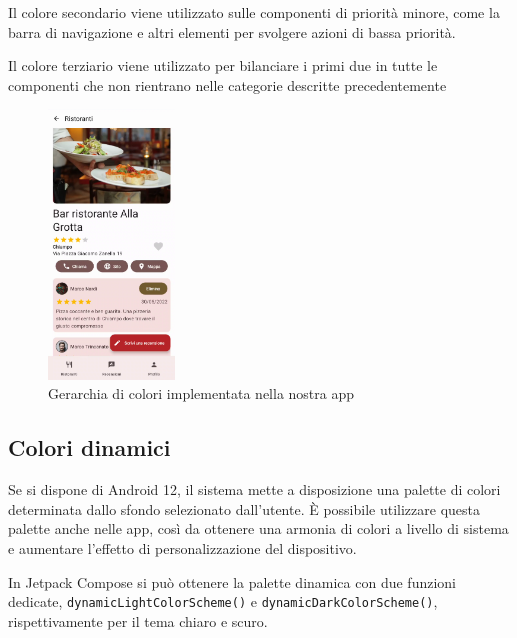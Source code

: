 \documentclass[12pt, a4paper]{report}
\begin{document}
		Il colore secondario viene utilizzato sulle componenti di priorità minore, come la barra di navigazione e altri elementi per svolgere azioni di bassa priorità.
		
		Il colore terziario viene utilizzato per bilanciare i primi due in tutte le componenti che non rientrano nelle categorie descritte precedentemente
		
		\begin{figure}[h]
   			\centering
   			\includegraphics[width=0.3\textwidth]{gerarchia_colori} %
 			\caption{Gerarchia di colori implementata nella nostra app}
 			\label{gerarchia_colori}
		\end{figure}
		
		\subsection{Colori dinamici}
		Se si dispone di Android 12, il sistema mette a disposizione una palette di colori determinata dallo sfondo selezionato dall'utente. È possibile utilizzare questa palette anche nelle app, così da ottenere una armonia di colori a livello di sistema e aumentare l'effetto di personalizzazione del dispositivo.
		
		In Jetpack Compose si può ottenere la palette dinamica con due funzioni dedicate, \texttt{dynamicLightColorScheme()} e \texttt{dynamicDarkColorScheme()}, rispettivamente per il tema chiaro e scuro.
		
\end{document}
